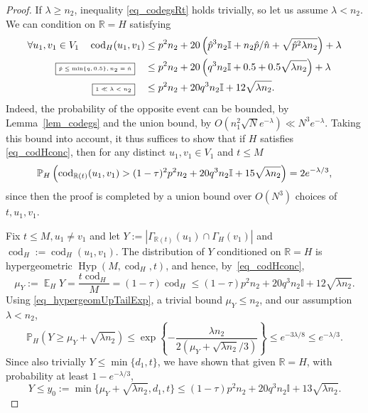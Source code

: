 \documentclass[12pt,reqno]{amsart}
\newcommand{\E}{\operatorname{\mathbb{E}}}
\newcommand{\Prob} {\mathbb {P}}
\newcommand{\probH}[1]{\Prob_H\left(#1\right)}
\newcommand{\R} {\mathbb R}
\newcommand{\I} {\mathbb I}
\newcommand{\Hyp}{\operatorname{Hyp}}
\newcommand{\cod}{\operatorname{cod}}
\theoremstyle{definition}
\newcommand{\justify}[1]{\fbox{\tiny{#1}}\quad}
\begin{document}
\begin{proof}
If $\lambda \ge n_2$, inequality \eqref{eq_codegsRt} holds trivially, so let us assume $\lambda < n_2$.
 We can condition on $\R = H$ satisfying
	\begin{align}
		\notag 		\forall u_1,v_1 \in V_1 \quad\cod_{H}(u_1,v_1) & \le p^2n_2+ 20\left(\hat p^3n_2\I + n_2\hat p/\hat n + \sqrt{\hat p^2\lambda n_2}\right)  + \lambda\\
		\notag \justify{$\hat p \le \min \{q, 0.5\}, n_2 = \hat n$}&\le p^2n_2+ 20\left(q^3n_2\I + 0.5 + 0.5\sqrt{\lambda n_2}\right)  + \lambda\\
		\label{eq_codHconc}
		\justify{$1 \ll \lambda < n_2$} &\le p^2n_2 + 20q^3n_2 \I + 12\sqrt{\lambda n_2}.
	\end{align}
Indeed, the probability of the opposite event can be bounded, by Lemma~\ref{lem_codegs} and the union bound,  by $O\left(n_1^2\sqrt Ne^{-\lambda}\right) \ll N^3e^{-\lambda}$. Taking this bound into account, it thus suffices to show that if $H$ satisfies \eqref{eq_codHconc}, then for any distinct $u_1, v_1\in V_1$ and $t \le M$
\begin{equation}
		\label{enough}
		\probH{\cod_{\R(t)}(u_1,v_1) > (1 - \tau)^2p^2 n_{2} + 20 q^3n_2\I + \constcodegsRt\sqrt{\lambda n_{2}}} = 2e^{-\lambda/3},
	\end{equation}
	since then the proof is completed by a union bound over $O(N^3)$ choices of $t, u_1, v_1$.

	
	Fix $t \le M, u_1 \neq v_1$ and let $Y := \left| \Gamma_{\R(t)}(u_1) \cap \Gamma_{H}(v_1)\right|$ and  $\cod_H := \cod_H(u_1, v_1)$. The distribution of $Y$ conditioned on $\R = H$ is hypergeometric $\Hyp(M, \cod_H, t)$, and hence, by~\eqref{eq_codHconc},
	\[
		\mu_Y := \E_H{Y} = \frac{t\cod_H}{M} = (1 - \tau) \cod_H \le (1 - \tau)p^2n_2 + 20q^3n_2 \I + 12 \sqrt{\lambda n_2}.
	\]
	Using \eqref{eq_hypergeomUpTailExp}, a trivial bound $\mu_Y \le n_2$, and our assumption $\lambda < n_2$,
	\[
		\probH{ Y \ge \mu_Y + \sqrt{\lambda n_2}} \le \exp\left\{-\frac{\lambda n_2}{2(\mu_Y + \sqrt{\lambda n_2}/3)}\right\} \le e^{-3\lambda/8}\le e^{-\lambda/3}.
	\]
	Since also trivially $Y \le \min\{d_1, t\}$, we have shown that given $\R = H$, with probability at least $1 - e^{-\lambda/3}$,
\begin{equation}
  \label{eq_Y}
	Y \le y_0 := \min \{\mu_Y + \sqrt{\lambda n_2}, d_1, t\} \le (1 - \tau)p^2n_2 + 20q^3n_2 \I + 13 \sqrt{\lambda n_2}.
\end{equation}


\end{proof}
\end{document}
